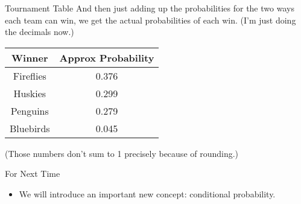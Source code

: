 \documentclass[
  ignorenonframetext,
]{beamer}
\providecommand{\tightlist}{%
  \setlength{\itemsep}{0pt}\setlength{\parskip}{0pt}}
\begin{document}
\begin{frame}{Tournament Table}
\protect\hypertarget{tournament-table-2}{}
And then just adding up the probabilities for the two ways each team can
win, we get the actual probabilities of each win. (I'm just doing the
decimals now.)

\begin{longtable}[]{@{}cc@{}}
\toprule
Winner & Approx Probability \\
\midrule
\endhead
Fireflies & 0.376 \\
Huskies & 0.299 \\
Penguins & 0.279 \\
Bluebirds & 0.045 \\
\bottomrule
\end{longtable}

(Those numbers don't sum to 1 precisely because of rounding.)
\end{frame}

\begin{frame}{For Next Time}
\protect\hypertarget{for-next-time}{}
\begin{itemize}
\tightlist
\item
  We will introduce an important new concept: conditional probability.
\end{itemize}
\end{frame}
\end{document}
